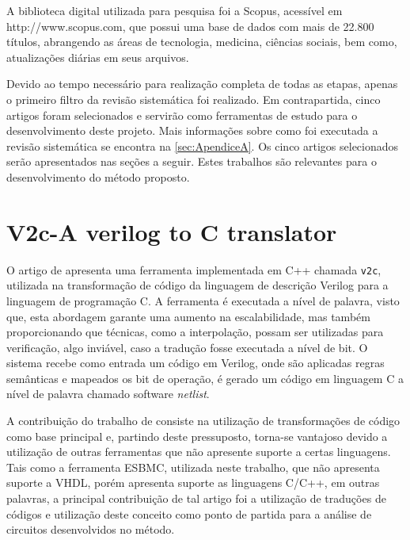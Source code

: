 \par
A biblioteca digital utilizada para pesquisa foi a Scopus, acessível em http://www.scopus.com, que possui uma base de dados com mais de 22.800 títulos, abrangendo as áreas de tecnologia, medicina, ciências sociais, bem como, atualizações diárias em seus arquivos.

\par
Devido ao tempo necessário para realização completa de todas as etapas, apenas o primeiro filtro da revisão sistemática foi realizado. Em contrapartida, cinco artigos foram selecionados e servirão como ferramentas de estudo para o desenvolvimento deste projeto. Mais informações sobre como foi executada a revisão sistemática se encontra na \autoref{sec:ApendiceA}. Os cinco artigos selecionados serão apresentados nas seções a seguir. Estes trabalhos são relevantes para o desenvolvimento do método proposto. 

\section{V2c-A verilog to C translator}

O artigo de  apresenta uma ferramenta implementada em C++ chamada \texttt{v2c}, utilizada na transformação de código da linguagem de descrição Verilog para a linguagem de programação C. A ferramenta é executada a nível de palavra, visto que, esta abordagem garante uma aumento na escalabilidade, mas também proporcionando que técnicas, como a interpolação\cite{beyer2011cpachecker}, possam ser utilizadas para verificação, algo inviável, caso a tradução fosse executada a nível de bit. O sistema recebe como entrada um código em Verilog, onde são aplicadas regras semânticas e mapeados os bit de operação, é gerado um código em linguagem C a nível de palavra chamado software \textit{netlist}.

\par
A contribuição do trabalho de  consiste na utilização de transformações de código como base principal e, partindo deste pressuposto, torna-se vantajoso devido a utilização de outras ferramentas que não apresente suporte a certas linguagens. Tais como a ferramenta ESBMC, utilizada neste trabalho, que não apresenta suporte a VHDL, porém apresenta suporte as linguagens C/C++, em outras palavras, a principal contribuição de tal artigo foi a utilização de traduções de códigos e utilização deste conceito como ponto de partida para a análise de circuitos desenvolvidos no método.

